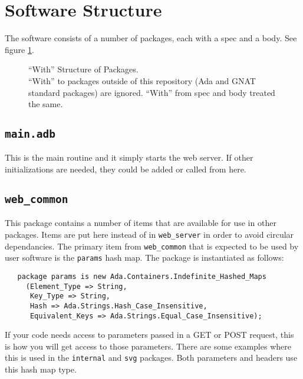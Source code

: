 \documentclass[10pt, openany, draft]{article}
\begin{document}
\section{Software Structure}
The software consists of a number of packages, each with a spec and a body.  See figure \ref{fig:With}.
\begin{figure}
  \centering
  
  \caption{``With'' Structure of Packages.\\  ``With'' to packages outside of this repository (Ada and GNAT standard packages) are ignored.  ``With'' from spec and body treated the same.}
  \label{fig:With}
\end{figure}

\subsection{\texttt{main.adb}}
This is the main routine and it simply starts the web server.  If other initializations are needed, they could be added or called from here.

\subsection{\texttt{web\_common}}
This package contains a number of items that are available for use in other packages.  Items are put here instead of in \texttt{web\_server} in order to avoid circular dependancies.  The primary item from \texttt{web\_common} that is expected to be used by user software is the \texttt{params} hash map.  The package is instantiated as follows:
\begin{verbatim}
   package params is new Ada.Containers.Indefinite_Hashed_Maps
     (Element_Type => String,
      Key_Type => String,
      Hash => Ada.Strings.Hash_Case_Insensitive,
      Equivalent_Keys => Ada.Strings.Equal_Case_Insensitive);
\end{verbatim}
If your code needs access to parameters passed in a GET or POST request, this is how you will get access to those parameters.  There are some examples where this is used in the \texttt{internal} and \texttt{svg} packages.  Both parameters and headers use this hash map type.
\end{document}
